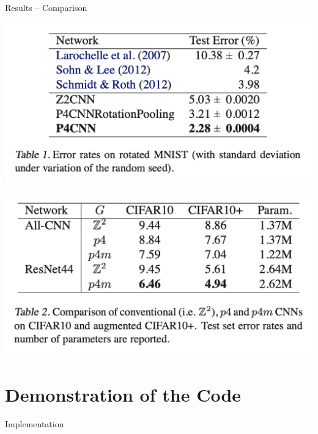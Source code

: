 \documentclass{beamer}
\begin{document}
\begin{frame}{Results -- Comparison}
    \begin{minipage}{0.5\textwidth}
        \includegraphics[width=\linewidth]{Screenshot 2024-01-13 at 11.28.16 AM.png} %
    \end{minipage}%
    \begin{minipage}{0.5\textwidth}
        \includegraphics[width=\linewidth]{Screenshot 2024-01-13 at 11.28.27 AM.png} %
    \end{minipage}
\end{frame}

\section{Demonstration of the Code}
\begin{frame}{Implementation}
    
\end{frame}

\end{document}
